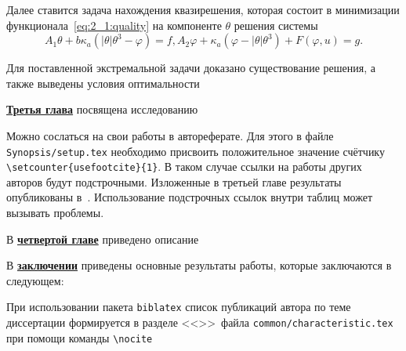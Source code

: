 Далее ставится задача нахождения квазирешения, которая состоит в минимизации
функционала~\eqref{eq:2_1:quality} на компоненте $\theta$ решения системы
\begin{equation}
    \label{eq:2_1:weakOperational}
    A_1 \theta + b \kappa_a (| \theta | \theta^3 - \varphi ) =
    f, A_2 \varphi + \kappa_a (\varphi - |\theta|\theta^3) + F(\varphi, u) = g.
\end{equation}


Для поставленной экстремальной задачи доказано существование решения, а также
выведены условия оптимальности














\underline{\textbf{Третья глава}} посвящена исследованию

Можно сослаться на свои работы в автореферате. Для этого в файле
\verb!Synopsis/setup.tex! необходимо присвоить положительное значение
счётчику \verb!\setcounter{usefootcite}{1}!. В таком случае ссылки на
работы других авторов будут подстрочными.
Изложенные в третьей главе результаты опубликованы в~\cite{vakbib1, vakbib2}.
Использование подстрочных ссылок внутри таблиц может вызывать проблемы.

В \underline{\textbf{четвертой главе}} приведено описание

\FloatBarrier
{}                                  %
В \underline{\textbf{заключении}} приведены основные результаты работы, которые заключаются в следующем:


При использовании пакета \verb!biblatex! список публикаций автора по теме
диссертации формируется в разделе <<\publications>>\ файла
\verb!common/characteristic.tex!  при помощи команды \verb!\nocite!

